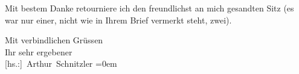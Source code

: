 \pstart
           {\pb}Mit bestem Danke retourniere ich den freundlichst
               an mich gesandten Sitz (es war nur einer, nicht wie in Ihrem Brief vermerkt steht,
               zwei).\pend
           
\pstart
           Mit verbindlichen Grüssen{\\[\baselineskip]}Ihr sehr ergebener{\\[\baselineskip]}\spacefill\mbox{{[}hs.:{]} Arthur Schnitzler}\pend
           \leftskip=0em{}\endnumbering{}  
      